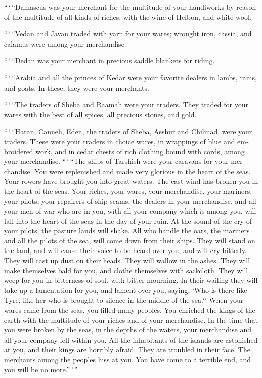 \begin{paracol}{2}
\begin{otherlanguage}{english}
 ``\,`\,``Damascus was your merchant for the multitude of
your handiworks by reason of the multitude of all kinds of riches, with
the wine of Helbon, and white wool.

 ``\,`\,``Vedan and Javan traded with yarn for your
wares; wrought iron, cassia, and calamus were among your merchandise.

 ``\,`\,``Dedan was your merchant in precious saddle
blankets for riding.

 ``\,`\,``Arabia and all the princes of Kedar were your
favorite dealers in lambs, rams, and goats. In these, they were your
merchants.

 ``\,`\,``The traders of Sheba and Raamah were your
traders. They traded for your wares with the best of all spices, all
precious stones, and gold.

 ``\,`\,``Haran, Canneh, Eden, the traders of Sheba,
Asshur and Chilmad, were your traders.  These were your
traders in choice wares, in wrappings of blue and embroidered work, and
in cedar chests of rich clothing bound with cords, among your
merchandise.  ``\,`\,``The ships of Tarshish were your
caravans for your merchandise. You were replenished and made very
glorious in the heart of the seas.  Your rowers have
brought you into great waters. The east wind has broken you in the heart
of the seas.  Your riches, your wares, your merchandise,
your mariners, your pilots, your repairers of ship seams, the dealers in
your merchandise, and all your men of war who are in you, with all your
company which is among you, will fall into the heart of the seas in the
day of your ruin.  At the sound of the cry of your
pilots, the pasture lands will shake.  All who handle the
oars, the mariners and all the pilots of the sea, will come down from
their ships. They will stand on the land,  and will cause
their voice to be heard over you, and will cry bitterly. They will cast
up dust on their heads. They will wallow in the ashes. 
They will make themselves bald for you, and clothe themselves with
sackcloth. They will weep for you in bitterness of soul, with bitter
mourning.  In their wailing they will take up a
lamentation for you, and lament over you, saying, `Who is there like
Tyre, like her who is brought to silence in the middle of the sea?'
 When your wares came from the seas, you filled many
peoples. You enriched the kings of the earth with the multitude of your
riches and of your merchandise.  In the time that you
were broken by the seas, in the depths of the waters, your merchandise
and all your company fell within you.  All the
inhabitants of the islands are astonished at you, and their kings are
horribly afraid. They are troubled in their face.  The
merchants among the peoples hiss at you. You have come to a terrible
end, and you will be no more.''\,'\,''


\end{otherlanguage}
\end{paracol}
